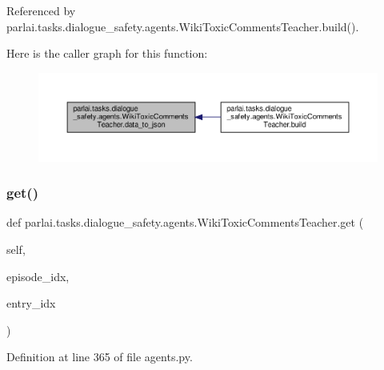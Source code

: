 Referenced by parlai.\+tasks.\+dialogue\+\_\+safety.\+agents.\+Wiki\+Toxic\+Comments\+Teacher.\+build().

Here is the caller graph for this function\+:
\nopagebreak
\begin{figure}[H]
\begin{center}
\leavevmode
\includegraphics[width=350pt]{classparlai_1_1tasks_1_1dialogue__safety_1_1agents_1_1WikiToxicCommentsTeacher_ab05b135cb36558dab5a04b4b00167159_icgraph}
\end{center}
\end{figure}
\mbox{\label{classparlai_1_1tasks_1_1dialogue__safety_1_1agents_1_1WikiToxicCommentsTeacher_a036126fb8ba0cb0dcd665a5b6bd4966f}} 
\subsubsection{\texorpdfstring{get()}{get()}}
{\footnotesize\ttfamily def parlai.\+tasks.\+dialogue\+\_\+safety.\+agents.\+Wiki\+Toxic\+Comments\+Teacher.\+get (\begin{DoxyParamCaption}\item[{}]{self,  }\item[{}]{episode\+\_\+idx,  }\item[{}]{entry\+\_\+idx }\end{DoxyParamCaption})}



Definition at line 365 of file agents.\+py.



